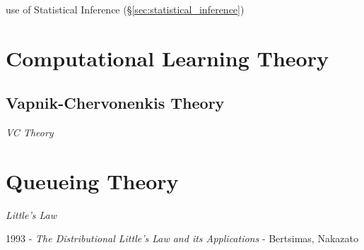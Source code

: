 use of Statistical Inference (\S\ref{sec:statistical_inference})



\section{Computational Learning Theory}\label{sec:computational_learning_theory}




\subsection{Vapnik-Chervonenkis Theory}\label{sec:vc_theory}

\emph{VC Theory}



\section{Queueing Theory}\label{sec:queueing_theory}

\emph{Little's Law}

1993 - \emph{The Distributional Little's Law and its Applications} - Bertsimas,
Nakazato
